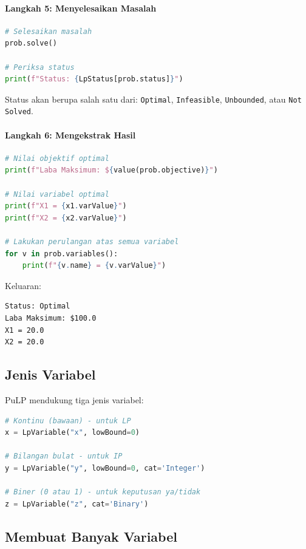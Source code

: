 \paragraph{Langkah 5: Menyelesaikan Masalah}

\begin{lstlisting}[language=Python]
# Selesaikan masalah
prob.solve()

# Periksa status
print(f"Status: {LpStatus[prob.status]}")
\end{lstlisting}

Status akan berupa salah satu dari: \texttt{Optimal}, \texttt{Infeasible}, \texttt{Unbounded}, atau \texttt{Not Solved}.

\paragraph{Langkah 6: Mengekstrak Hasil}

\begin{lstlisting}[language=Python]
# Nilai objektif optimal
print(f"Laba Maksimum: ${value(prob.objective)}")

# Nilai variabel optimal
print(f"X1 = {x1.varValue}")
print(f"X2 = {x2.varValue}")

# Lakukan perulangan atas semua variabel
for v in prob.variables():
    print(f"{v.name} = {v.varValue}")
\end{lstlisting}

Keluaran:
\begin{verbatim}
Status: Optimal
Laba Maksimum: $100.0
X1 = 20.0
X2 = 20.0
\end{verbatim}

\subsection{Jenis Variabel}

PuLP mendukung tiga jenis variabel:

\begin{lstlisting}[language=Python]
# Kontinu (bawaan) - untuk LP
x = LpVariable("x", lowBound=0)

# Bilangan bulat - untuk IP
y = LpVariable("y", lowBound=0, cat='Integer')

# Biner (0 atau 1) - untuk keputusan ya/tidak
z = LpVariable("z", cat='Binary')
\end{lstlisting}

\subsection{Membuat Banyak Variabel}

